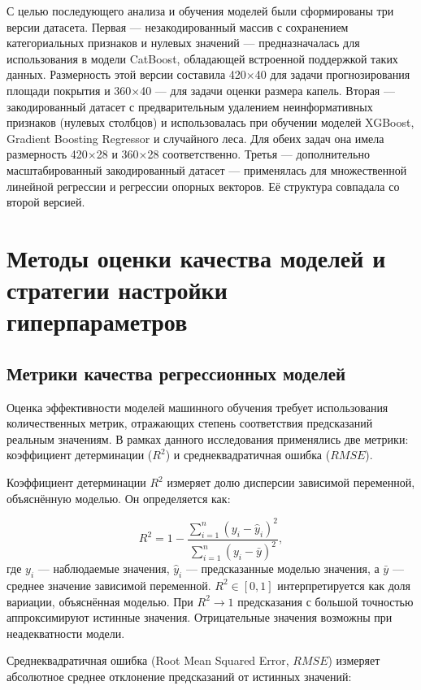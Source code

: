 С целью последующего анализа и обучения моделей были сформированы три версии датасета. Первая --- незакодированный массив с сохранением категориальных признаков и нулевых значений --- предназначалась для использования в модели CatBoost, обладающей встроенной поддержкой таких данных. Размерность этой версии составила 420×40 для задачи прогнозирования площади покрытия и 360×40 --- для задачи оценки размера капель. Вторая --- закодированный датасет с предварительным удалением неинформативных признаков (нулевых столбцов) и использовалась при обучении моделей XGBoost, Gradient Boosting Regressor и случайного леса. Для обеих задач она имела размерность 420×28 и 360×28 соответственно. Третья --- дополнительно масштабированный закодированный датасет --- применялась для множественной линейной регрессии и регрессии опорных векторов. Её структура совпадала со второй версией.

\section{Методы оценки качества моделей и стратегии настройки гиперпараметров} \label{ch1:metrics}

\subsection{Метрики качества регрессионных моделей}

Оценка эффективности моделей машинного обучения требует использования количественных метрик, отражающих степень соответствия предсказаний реальным значениям. В рамках данного исследования применялись две метрики: коэффициент детерминации ($R^2$) и среднеквадратичная ошибка ($RMSE$).

Коэффициент детерминации $R^2$ измеряет долю дисперсии зависимой переменной, объяснённую моделью. Он определяется как:

\begin{equation}\label{ch1:R2}
R^2 = 1 - \frac{\sum_{i=1}^{n} (y_i - \hat{y}_i)^2}{\sum_{i=1}^{n} (y_i - \bar{y})^2},
\end{equation}
где $y_i$ --- наблюдаемые значения, $\hat{y}_i$ — предсказанные моделью значения, а $\bar{y}$ — среднее значение зависимой переменной. $R^2 \in [0, 1]$ интерпретируется как доля вариации, объяснённая моделью. При $R^2 \to 1$ предсказания с большой точностью аппроксимируют истинные значения. Отрицательные значения возможны при неадекватности модели.

Среднеквадратичная ошибка (Root Mean Squared Error, $RMSE$) измеряет абсолютное среднее отклонение предсказаний от истинных значений:


